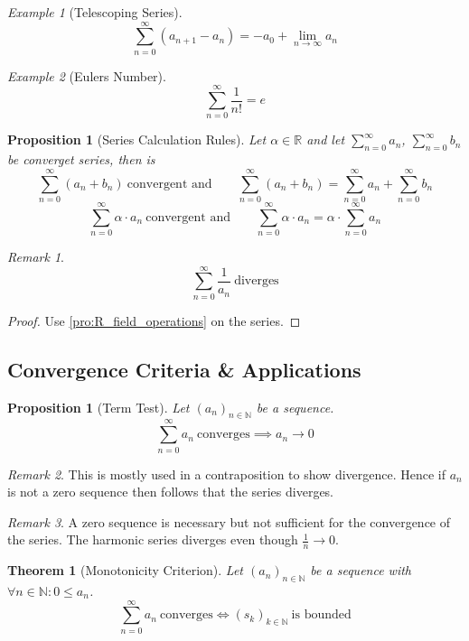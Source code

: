 \documentclass[english,titlepage]{uzhpub}
\theoremstyle{definition}
\theoremstyle{plain}
\newtheorem{proposition}[definition]{Proposition}
\newtheorem{theorem}[definition]{Theorem} %
\theoremstyle{remark}
\newtheorem*{remark}{Remark}
\theoremstyle{example}
\newtheorem*{example}{Example}
\begin{document}
   \begin{example}[Telescoping Series]
      \[\sum_{n=0}^\infty (a_{n+1} - a_n) = -a_0 + \lim_{n \to \infty} a_n\]
   \end{example}
   \begin{example}[Eulers Number]
      \[\sum_{n = 0}^\infty \frac{1}{n!} = e\]
   \end{example}

   \begin{proposition}[Series Calculation Rules]\label{pro:series_calc_rules}
      Let \(\alpha \in \mathbb{R}\) and let \(\sum_{n=0}^\infty a_n\), \(\sum_{n=0}^\infty b_n\) be converget series, then is
      \[\sum_{n=0}^\infty (a_n + b_n)~\text{convergent and} \qquad \sum_{n = 0}^\infty (a_n + b_n) = \sum_{n = 0}^\infty a_n + \sum_{n = 0}^\infty b_n\]
      \[\sum_{n = 0}^\infty \alpha \cdot a_n~\text{convergent and} \qquad \sum_{n = 0}^\infty \alpha \cdot a_n = \alpha \cdot \sum_{n=0}^\infty a_n\]
   \end{proposition}
   \begin{remark}
      \[\sum_{n = 0}^\infty \frac{1}{a_n}~\text{diverges}\]
   \end{remark}
   \begin{proof}
      Use \cref{pro:R_field_operations} on the series.
   \end{proof}

   \subsection{Convergence Criteria \& Applications}
   \begin{proposition}[Term Test]\label{pro:series_sequence_converge}
      Let \((a_n)_{n \in \mathbb{N}}\) be a sequence.
      \[\sum_{n = 0}^\infty a_n~\text{converges} \implies a_n \to 0\]
   \end{proposition}
   \begin{remark}
      This is mostly used in a contraposition to show divergence.
      Hence if \(a_n\) is not a zero sequence then follows that the series diverges.
   \end{remark}
   \begin{remark}
      A zero sequence is necessary but not sufficient for the convergence of the series.
      The harmonic series diverges even though \(\frac{1}{n} \to 0\).
   \end{remark}

   \begin{theorem}[Monotonicity Criterion]\label{thm:convergence=bounded}
      Let \((a_n)_{n \in \mathbb{N}}\) be a sequence with \(\forall n \in \mathbb{N}: 0 \leq a_n\).
      \[\sum_{n = 0}^\infty a_n~\text{converges} \iff (s_k)_{k \in \mathbb{N}}~\text{is bounded}\]
   \end{theorem}
\end{document}
